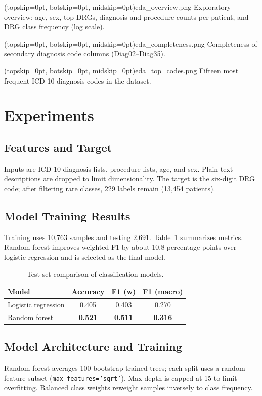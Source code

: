 \documentclass{ieeeaccess}
\begin{document}
\Figure[t!](topskip=0pt, botskip=0pt, midskip=0pt){eda_overview.png}
{Exploratory overview: age, sex, top DRGs, diagnosis and procedure counts per patient, and DRG class frequency (log scale).\label{fig:overview}}

\Figure[t!](topskip=0pt, botskip=0pt, midskip=0pt){eda_completeness.png}
{Completeness of secondary diagnosis code columns (Diag02--Diag35).\label{fig:completeness}}

\Figure[t!](topskip=0pt, botskip=0pt, midskip=0pt){eda_top_codes.png}
{Fifteen most frequent ICD-10 diagnosis codes in the dataset.\label{fig:topcodes}}

\section{Experiments}
\label{sec:exp}

\subsection{Features and Target}
Inputs are ICD-10 diagnosis lists, procedure lists, age, and sex. Plain-text descriptions are dropped to limit dimensionality. The target is the six-digit DRG code; after filtering rare classes, 229 labels remain (13{,}454 patients).

\subsection{Model Training Results}
Training uses 10{,}763 samples and testing 2{,}691. Table~\ref{tab:models} summarizes metrics. Random forest improves weighted F1 by about 10.8 percentage points over logistic regression and is selected as the final model.

\begin{table}[!t]
\caption{Test-set comparison of classification models.}
\label{tab:models}
\centering
\begin{tabular}{lccc}
\hline
\textbf{Model} & \textbf{Accuracy} & \textbf{F1 (w)} & \textbf{F1 (macro)} \\
\hline
Logistic regression & 0.405 & 0.403 & 0.270 \\
Random forest & \textbf{0.521} & \textbf{0.511} & \textbf{0.316} \\
\hline
\end{tabular}
\end{table}

\subsection{Model Architecture and Training}
Random forest averages 100 bootstrap-trained trees; each split uses a random feature subset (\texttt{max\_features='sqrt'}). Max depth is capped at 15 to limit overfitting. Balanced class weights reweight samples inversely to class frequency.
\end{document}
